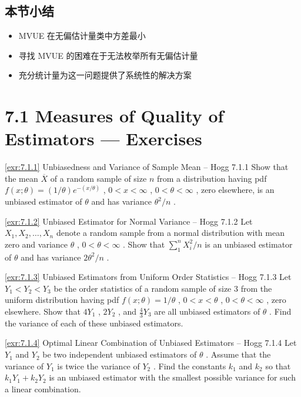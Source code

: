 \subsection*{本节小结}

\begin{itemize}
\item MVUE 在无偏估计量类中方差最小
\item 寻找 MVUE 的困难在于无法枚举所有无偏估计量
\item 充分统计量为这一问题提供了系统性的解决方案
\end{itemize}

\section{7.1 Measures of Quality of Estimators — Exercises}\label{sec:7.1-exercises}

\begin{exercise}{\ref{exr:7.1.1} Unbiasedness and Variance of Sample Mean – Hogg 7.1.1}\label{exr:7.1.1}
Show that the mean $\overline{X}$ of a random sample of size $n$ from a distribution having pdf $f(x;\theta) = (1 / \theta)e^{-(x / \theta)}$ , $0 < x < \infty$ , $0 < \theta < \infty$ , zero elsewhere, is an unbiased estimator of $\theta$ and has variance $\theta^2 / n$ .
\end{exercise}

\begin{exercise}{\ref{exr:7.1.2} Unbiased Estimator for Normal Variance – Hogg 7.1.2}\label{exr:7.1.2}
Let $X_{1}, X_{2}, \ldots, X_{n}$ denote a random sample from a normal distribution with mean zero and variance $\theta$ , $0 < \theta < \infty$ . Show that $\sum_{1}^{n} X_{i}^{2} / n$ is an unbiased estimator of $\theta$ and has variance $2\theta^{2} / n$ .
\end{exercise}

\begin{exercise}{\ref{exr:7.1.3} Unbiased Estimators from Uniform Order Statistics – Hogg 7.1.3}\label{exr:7.1.3}
Let $Y_{1} < Y_{2} < Y_{3}$ be the order statistics of a random sample of size 3 from the uniform distribution having pdf $f(x; \theta) = 1 / \theta$ , $0 < x < \theta$ , $0 < \theta < \infty$ , zero elsewhere. Show that $4Y_{1}$ , $2Y_{2}$ , and $\frac{4}{3}Y_{3}$ are all unbiased estimators of $\theta$ . Find the variance of each of these unbiased estimators.
\end{exercise}

\begin{exercise}{\ref{exr:7.1.4} Optimal Linear Combination of Unbiased Estimators – Hogg 7.1.4}\label{exr:7.1.4}
Let $Y_{1}$ and $Y_{2}$ be two independent unbiased estimators of $\theta$ . Assume that the variance of $Y_{1}$ is twice the variance of $Y_{2}$ . Find the constants $k_{1}$ and $k_{2}$ so that $k_{1}Y_{1} + k_{2}Y_{2}$ is an unbiased estimator with the smallest possible variance for such a linear combination.
\end{exercise}

